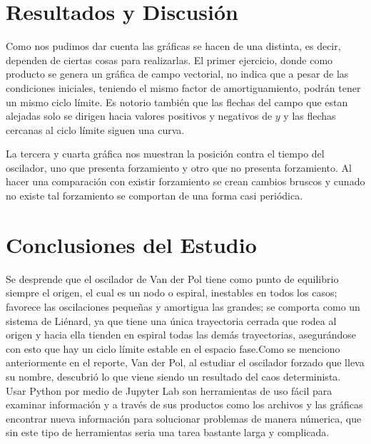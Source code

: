 \documentclass[12pt]{article}
\begin{document}
\section*{Resultados y Discusión}
Como nos pudimos dar cuenta las gráficas se hacen de una distinta, es decir, dependen de ciertas cosas para realizarlas.
El primer ejercicio, donde como producto se genera un gráfica de campo vectorial, no indica que a pesar de las condiciones iniciales, teniendo el mismo factor de amortiguamiento, podrán tener un mismo ciclo límite. Es notorio también que las flechas del campo que estan alejadas solo se dirigen hacia valores positivos y negativos de $y$ y las flechas cercanas al ciclo límite siguen una curva.

La tercera y cuarta gráfica nos muestran la posición contra el tiempo del oscilador, uno que presenta forzamiento y otro que no presenta forzamiento. Al hacer una comparación con existir forzamiento se crean cambios bruscos y cunado no existe tal forzamiento se comportan de una forma casi periódica.




\section*{Conclusiones del Estudio}
Se desprende que el oscilador de Van der Pol tiene como punto de equilibrio siempre el origen, el cual es un nodo o espiral,
inestables en todos los casos; favorece las oscilaciones
pequeñas y amortigua las grandes; se comporta como un sistema de Liénard, ya que tiene una única trayectoria cerrada que rodea al origen y hacia ella tienden en espiral todas las demás
trayectorias, asegurándose con esto que hay un ciclo límite estable en el espacio fase.Como se menciono anteriormente en el reporte, Van der Pol, al estudiar el oscilador forzado que lleva su nombre, descubrió lo que viene siendo un resultado del caos determinista. \\

Usar Python por medio de Jupyter Lab son herramientas de uso fácil para examinar información y a través de sus productos como los archivos y las gráficas encontrar nueva información para solucionar problemas de manera númerica, que sin este tipo de herramientas seria una tarea bastante larga y complicada.


\end{document}

